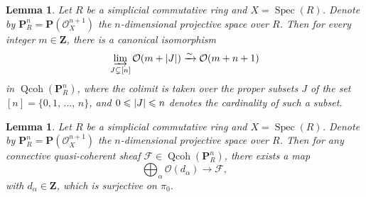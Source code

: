 \documentclass[11pt]{article}
\newtheorem{lemm}[theo]{Lemma}
\theoremstyle{definition}
\numberwithin{equation}{section}
\numberwithin{figure}{section}
\numberwithin{table}{section}
\DeclarePairedDelimiter\abs{\lvert}{\rvert}
\newcommand{\sF}{\ensuremath{\mathcal{F}}\xspace}
\newcommand{\sO}{\ensuremath{\mathcal{O}}\xspace}
\newcommand{\bP}{\ensuremath{\mathbf{P}}\xspace}
\newcommand{\bZ}{\ensuremath{\mathbf{Z}}\xspace}
\newcommand{\colim}{\varinjlim}
\newcommand{\isoto}{\xrightarrow{\sim}}
\renewcommand{\le}{\leqslant}
\renewcommand{\P}{\bP}
\DeclareMathOperator{\Spec}{Spec}
\DeclareMathOperator{\Qcoh}{Qcoh}
\begin{document}
\begin{lemm}\label{lem:O(n+1)}
Let $R$ be a simplicial commutative ring and $X = \Spec(R)$. Denote by $\P^n_R = \P(\sO^{n+1}_X)$ the $n$-dimensional projective space over $R$. Then for every integer $m\in\bZ$, there is a canonical isomorphism
\[
\colim_{J \subsetneq [n]} \sO(m+\abs{J}) \isoto \sO(m+n+1)
\]
in $\Qcoh(\P^n_R)$, where the colimit is taken over the proper subsets $J$ of the set\linebreak$[n] = \{0,1,\,\ldots,\,n\}$, and $0\le\abs{J}\le n$ denotes the cardinality of such a subset.
\end{lemm}

\begin{lemm}\label{lem:surjection from O(m)'s}
Let $R$ be a simplicial commutative ring and $X = \Spec(R)$. Denote by $\P^n_R = \P(\sO^{n+1}_X)$ the $n$-dimensional projective space over $R$. Then for any connective quasi-coherent sheaf $\sF \in \Qcoh(\P^n_R)$, there exists a map
\[
\bigoplus_\alpha \sO(d_\alpha) \to \sF,
\]
with $d_\alpha \in \bZ$, which is surjective on $\pi_0$.
\end{lemm}
\end{document}
